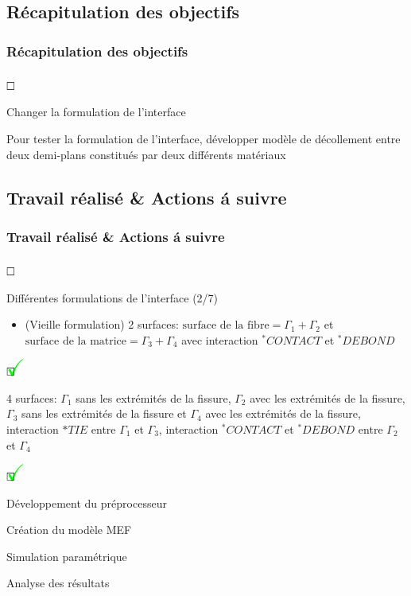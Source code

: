 \documentclass[first,firstsupp,lastsupp,handout,last,hyperref,table]{ETHclass}
\begin{document}
\subsection[Objectifs]{R\'ecapitulation des objectifs}

\begin{frame}
\frametitle{R\'ecapitulation des objectifs}
\vspace{-0.5cm}
\vspace{-0.5cm}
\begin{list}{$\text{\rlap{\textcolor{white}{\huge$\mathbf{\checkmark}$}}}\square$}{}  
\item Changer la formulation de l'interface
\item Pour tester la formulation de l'interface, d\'evelopper mod\`ele de d\'ecollement entre deux demi-plans constitu\'es par deux diff\'erents mat\'eriaux
\end{list}
\end{frame}

\subsection{Travail r\'ealis\'e \& Actions \'a suivre}

\begin{frame}
\frametitle{Travail r\'ealis\'e \& Actions \'a suivre}
\vspace{-0.5cm}
\scriptsize
\begin{list}{$\text{\rlap{\textcolor{white}{\huge$\mathbf{\checkmark}$}}}\square$}{}  
\item Diff\'erentes formulations de l'interface (2/7)
\begin{itemize}[label=]
\item (Vieille formulation) 2 surfaces: $\text{surface de la fibre}=\Gamma_{1}+\Gamma_{2}$ et $\text{surface de la matrice}=\Gamma_{3}+\Gamma_{4}$ avec interaction $^{*}CONTACT$ et $^{*}DEBOND$ 
\end{itemize}
\begin{list}{$\text{\rlap{\textcolor{green}{\huge$\mathbf{\checkmark}$}}}\square$}{}  
\item 4 surfaces: $\Gamma_{1}$ sans les extr\'emit\'es de la fissure, $\Gamma_{2}$ avec les extr\'emit\'es de la fissure, $\Gamma_{3}$ sans les extr\'emit\'es de la fissure et $\Gamma_{4}$ avec les extr\'emit\'es de la fissure, interaction $*TIE$ entre  $\Gamma_{1}$ et $\Gamma_{3}$, interaction $^{*}CONTACT$ et $^{*}DEBOND$ entre  $\Gamma_{2}$ et $\Gamma_{4}$
\begin{list}{$\text{\rlap{\textcolor{green}{\huge$\mathbf{\checkmark}$}}}\square$}{}
\item D\'eveloppement du pr\'eprocesseur
\item Cr\'eation du mod\`ele MEF
\item Simulation param\'etrique
\item Analyse des r\'esultats
\end{list}
\end{list}
\end{list}
\end{frame}
\end{document}
